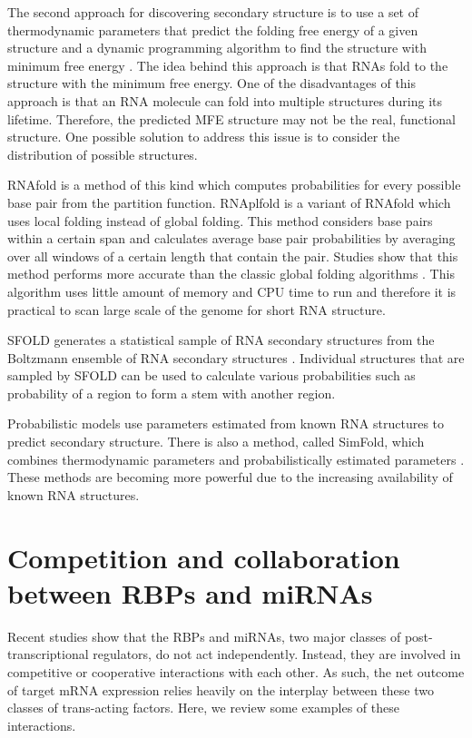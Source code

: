 The second approach for discovering secondary structure is to use a set of thermodynamic parameters that predict the folding free energy of a given structure and a dynamic programming algorithm to find the structure with minimum free energy \cite{mathews_1999, mathews_06}. The idea behind this approach is that RNAs fold to the structure with the minimum free energy. One of the disadvantages of this approach is that an RNA molecule can fold into multiple structures during its lifetime. Therefore, the predicted MFE structure may not be the real, functional structure. One possible solution to address this issue is to consider the distribution of possible structures.

RNAfold is a method of this kind which computes probabilities for every possible base pair from the partition function. RNAplfold is a variant of RNAfold which uses local folding instead of global folding. This method considers base pairs within a certain span and calculates average base pair probabilities by averaging over all windows of a certain length that contain the pair. Studies show that this method performs more accurate than the classic global folding algorithms \cite{lange_12}. This algorithm uses little amount of memory and CPU time to run and therefore it is practical to scan large scale of the genome for short RNA structure.

SFOLD generates a statistical sample of RNA secondary structures from the Boltzmann ensemble of RNA secondary structures \cite{sfold}. Individual structures that are sampled by SFOLD can be used to calculate various probabilities such as probability of a region to form a stem with another region. 

Probabilistic models use parameters estimated from known RNA structures to predict secondary structure. There is also a method, called SimFold, which combines thermodynamic parameters and probabilistically estimated parameters \cite{andronescu_10}. These methods are becoming more powerful due to the increasing availability of known RNA structures.


\section{Competition and collaboration between RBPs and miRNAs}

Recent studies show that the RBPs and miRNAs, two major classes of post-transcriptional regulators, do not act independently. Instead, they are involved in competitive or cooperative interactions with each other. As such, the net outcome of target mRNA expression relies heavily on the interplay between these two classes of trans-acting factors. Here, we review some examples of these interactions.


